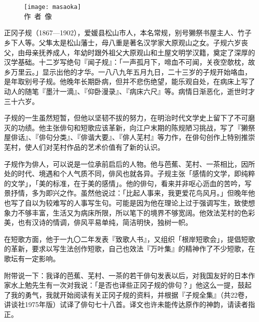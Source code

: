 
\chapter[{\FM 正岡子規}]{\FM {}}

\begin{center}
    \begin{figure}
        \centering
        \texttt{[image: masaoka]}\\[1em]
        \large{\FS 作~者~像}
    \end{figure}
\end{center}

\newpage
{\FS
    正冈子规（1867—1902），爱媛县松山市人，本名常规，别号獭祭书屋主人、竹子乡下人等。父隼太是松山藩士，母八重是著名汉学家大原观山之女。子规六岁丧父，由母亲抚养成人，年幼时跟外祖父大原观山和土屋文明学汉籍，奠定了深厚的汉学基础。十二岁写绝句『闻子规』：「一声孤月下，啼血不可闻，关夜空欹枕，故乡万里云。」显示出他的才华。一八八九年五月九日，二十三岁的子规开始咯血，是年取别号子规。他晚年长期卧病，但并不悲伤绝望，能乐观自处，在病床上写了动人的随笔『墨汁一滴』、『仰卧漫录』、『病床六尺』等。病情日渐恶化，逝世时才三十六岁。

    子规的一生虽然短暂，但他以坚韧不拔的努力，在明治时代文学史上留下了不可磨灭的功绩。他主张俳句和短歌应该革新，向江户末期的陈规陋习挑战，写了『獭祭屋俳话』、『俳句分类』、『俳谐大要』、『俳人芜村』等力作，在俳句创作上特别推崇芜村，使人们对芜村作品的艺术价值有了新的认识。

    子规作为俳人，可以说是一位承前启后的人物。他与芭蕉、芜村、一茶相比，因所处的时代、境遇和个人气质不同，俳风也就各异。子规主张「感情的文学，即纯粹的文学」，「美的标准，在于美的感情」。他的俳句，看来并非呕心沥血的苦吟，写景抒情，多为即兴之作。虽然他说过：「比起人事来，我更爱花鸟风月。」但晚年他也写了自以为较难写的人事写生句。可能是因为他在理论上过于强调写生，致使想象力不够丰富，生活又为病床所限，所以笔下的境界不够宽阔。他效法芜村的色彩美，也有汉诗的情调，俳风平易单纯，简洁明快，独树一帜。

    在短歌方面，他于一九〇二年发表『致歌人书』，又组织「根岸短歌会」，提倡短歌的革新，要求以写生法创作短歌，自己也效法『万叶集』的精神作了不少短歌，在歌坛有一定影响。

    附带说一下：我译的芭蕉、芜村、一茶的若干俳句发表以后，对我国友好的日本作家水上勉先生有一次对我说：「是否也译些正冈子规的俳句？」他这么一提，鼓起了我的勇气，我就开始阅读有关正冈子规的资料，并根据『子规全集』（共22卷，讲谈社1975年版）试译了俳句七十八首。译文也许未能传达原作的神韵，请读者指正。
}

